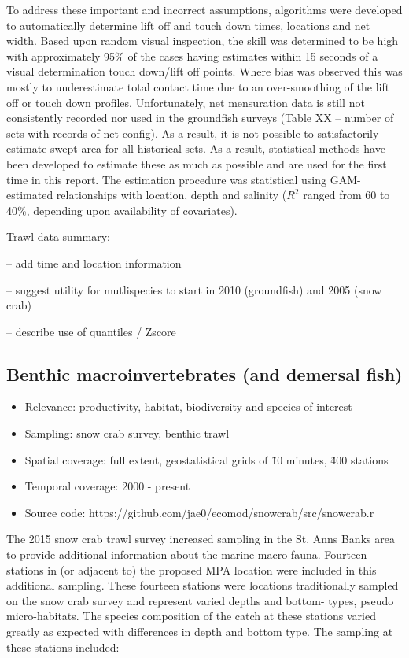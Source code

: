 \documentclass[letterpaper,portrait,11pt]{scrartcl}
\numberwithin{equation}{section}		%
\numberwithin{figure}{section}			%
\numberwithin{table}{section}				%
\begin{document}
\begin{itemize*}
To address these important and incorrect assumptions, algorithms were developed to automatically determine lift off and touch down times, locations and net width. Based upon random visual inspection, the skill was determined to be high with approximately 95\% of the cases having estimates within 15 seconds of a visual determination touch down/lift off points. Where bias was observed this was mostly to underestimate total contact time due to an over-smoothing of the lift off or touch down profiles. Unfortunately, net mensuration data is still not consistently recorded nor used in the groundfish surveys (Table XX -- number of sets with records of net config). As a result, it is not possible to satisfactorily estimate swept area for all historical sets. As a result, statistical methods have been developed to estimate these as much as possible and are used for the first time in this report. The estimation procedure was statistical using GAM-estimated relationships with location, depth and salinity ($R^2$ ranged from 60 to 40\%, depending upon availability of covariates). 


Trawl data summary:

-- add time and location information

-- suggest utility for mutlispecies to start in 2010 (groundfish) and 2005 (snow crab)

-- describe use of quantiles / Zscore





\subsection{Benthic macroinvertebrates (and demersal fish)}
\begin{itemize}
  \item Relevance:  productivity, habitat, biodiversity and species of interest
  \item Sampling:  snow crab survey, benthic trawl 
  \item Spatial coverage: full extent, geostatistical grids of \~10 minutes, \~400 stations
  \item Temporal coverage: 2000 - present
  \item Source code: https://github.com/jae0/ecomod/snowcrab/src/snowcrab.r
\end{itemize}




The 2015 snow crab trawl survey increased sampling in the St. Anns Banks area to provide additional information about the marine macro-fauna. Fourteen stations in (or adjacent to) the proposed MPA location were included in this additional sampling. These fourteen stations were locations traditionally sampled on the snow crab survey and represent varied depths and bottom- types, pseudo micro-habitats. The species composition of the catch at these stations varied greatly as expected with differences in depth and bottom type. The sampling at these stations included:


\end{itemize*}
\end{document}
